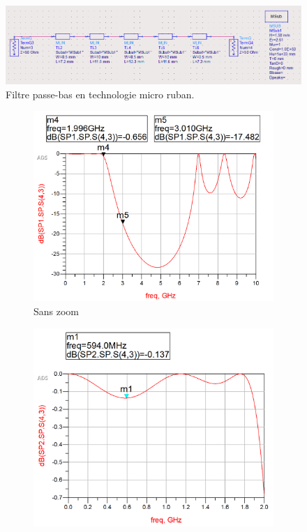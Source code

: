 \documentclass[french]{article}
\begin{document}
\begin{figure}[H]
	\centering
	\includegraphics[width=15cm]{photo/passe_bas_vic/schema_distribue_passe_bas_ads.png}
	\caption{Filtre passe-bas en technologie micro ruban.}
	\label{fig:schema_distribue_passe_bas_ads}
\end{figure}



\begin{figure}[H]
	\centering
	\begin{subfigure}[b]{0.49\textwidth}
		\includegraphics[width=\textwidth]{photo/passe_bas_vic/simu_passe_bas_distribue.PNG}
		\caption{Sans zoom}
		\label{fig:simu_passe_bas_distribue}
	\end{subfigure}
	\begin{subfigure}[b]{0.49\textwidth}
		\includegraphics[width=\textwidth]{photo/passe_bas_vic/simu_zoom_passe_bas_distribue.PNG}

\end{subfigure}
\end{figure}
\end{document}
